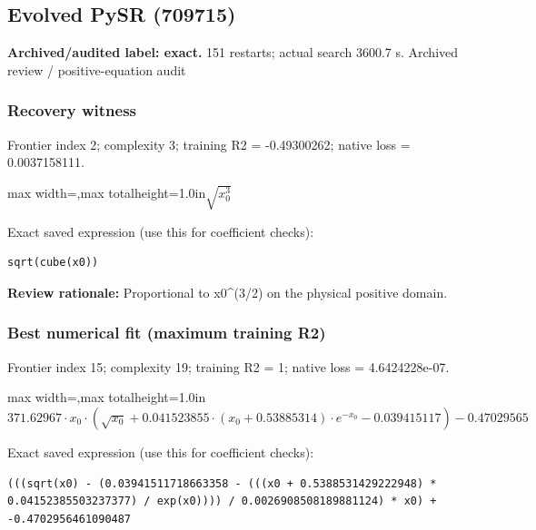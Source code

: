 \documentclass[10pt,letterpaper,landscape]{article}
\begin{document}
\begin{minipage}[t]{0.485\textwidth}
\subsection*{Evolved PySR (709715)}
\textbf{Archived/audited label: exact.} 151 restarts; actual search 3600.7 s.
{\small Archived review / positive-equation audit}
\subsubsection*{Recovery witness}
Frontier index 2; complexity 3; training R2 = -0.49300262; native loss = 0.0037158111.
\begin{center}\begin{adjustbox}{max width=\linewidth,max totalheight=1.0in}$\displaystyle \sqrt{x_{0}^{3}}$\end{adjustbox}\end{center}
{\scriptsize Exact saved expression (use this for coefficient checks):}
\begin{lstlisting}
sqrt(cube(x0))
\end{lstlisting}
{\small\textbf{Review rationale:} Proportional to x0\textasciicircum{}(3/2) on the physical positive domain.}
\subsubsection*{Best numerical fit (maximum training R2)}
Frontier index 15; complexity 19; training R2 = 1; native loss = 4.6424228e-07.
\begin{center}\begin{adjustbox}{max width=\linewidth,max totalheight=1.0in}$\displaystyle 371.62967 \cdot x_{0} \cdot \left(\sqrt{x_{0}} + 0.041523855 \cdot \left(x_{0} + 0.53885314\right) \cdot e^{- x_{0}} - 0.039415117\right) - 0.47029565$\end{adjustbox}\end{center}
{\scriptsize Exact saved expression (use this for coefficient checks):}
\begin{lstlisting}
(((sqrt(x0) - (0.03941511718663358 - (((x0 + 0.5388531429222948) * 0.04152385503237377) / exp(x0)))) / 0.0026908508189881124) * x0) + -0.4702956461090487
\end{lstlisting}
\end{minipage}
\clearpage{}\label{kepler-10006}
\end{document}
